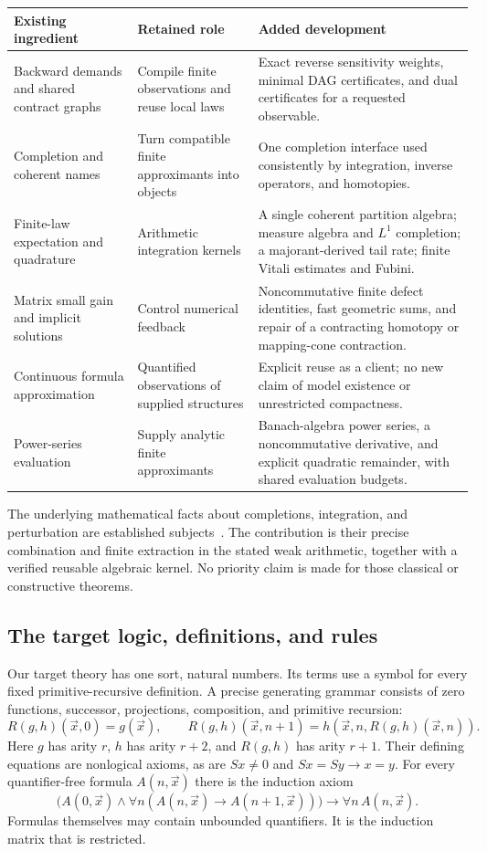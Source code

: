 \begin{longtable}{@{}P{.26\textwidth}P{.31\textwidth}P{.36\textwidth}@{}}
\toprule Existing ingredient & Retained role & Added development\\\midrule\endhead
Backward demands and shared contract graphs & Compile finite observations and reuse local laws & Exact reverse sensitivity weights, minimal DAG certificates, and dual certificates for a requested observable.\\
Completion and coherent names & Turn compatible finite approximants into objects & One completion interface used consistently by integration, inverse operators, and homotopies.\\
Finite-law expectation and quadrature & Arithmetic integration kernels & A single coherent partition algebra; measure algebra and $L^1$ completion; a majorant-derived tail rate; finite Vitali estimates and Fubini.\\
Matrix small gain and implicit solutions & Control numerical feedback & Noncommutative finite defect identities, fast geometric sums, and repair of a contracting homotopy or mapping-cone contraction.\\
Continuous formula approximation & Quantified observations of supplied structures & Explicit reuse as a client; no new claim of model existence or unrestricted compactness.\\
Power-series evaluation & Supply analytic finite approximants & Banach-algebra power series, a noncommutative derivative, and explicit quadratic remainder, with shared evaluation budgets.\\
\bottomrule
\end{longtable}

The underlying mathematical facts about completions, integration, and perturbation are established subjects~\cite{oconnor2007,spitters2006,crainic2004}. The contribution is their precise combination and finite extraction in the stated weak arithmetic, together with a verified reusable algebraic kernel. No priority claim is made for those classical or constructive theorems.

\subsection{The target logic, definitions, and rules}

Our target theory has one sort, natural numbers. Its terms use a symbol for every fixed primitive-recursive definition. A precise generating grammar consists of zero functions, successor, projections, composition, and primitive recursion:
\[
 R(g,h)(\vec x,0)=g(\vec x),\qquad
 R(g,h)(\vec x,n+1)=h(\vec x,n,R(g,h)(\vec x,n)).
\]
Here $g$ has arity $r$, $h$ has arity $r+2$, and $R(g,h)$ has arity $r+1$. Their defining equations are nonlogical axioms, as are $Sx\ne0$ and $Sx=Sy\to x=y$. For every quantifier-free formula $A(n,\vec x)$ there is the induction axiom
\[
 \bigl(A(0,\vec x)\wedge\forall n(A(n,\vec x)\to A(n+1,\vec x))\bigr)
 \to\forall n\,A(n,\vec x).
\]
Formulas themselves may contain unbounded quantifiers. It is the induction matrix that is restricted.

